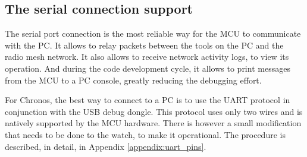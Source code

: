\subsection{The serial connection support}


The serial port connection is the most reliable way for the MCU to communicate with the PC. It allows to relay packets between the tools on the PC and the radio mesh network. It also allows to receive network activity logs, to view its operation. And during the code development cycle, it allows to print messages from the MCU to a PC console, greatly reducing the debugging effort.

For Chronos, the best way to connect to a PC is to use the UART protocol in conjunction with the USB debug dongle. This protocol uses only two wires and is natively supported by the MCU hardware. There is however a small modification that needs to be done to the watch, to make it operational. The procedure is described, in detail, in Appendix \ref{appendix:uart_pins}.

